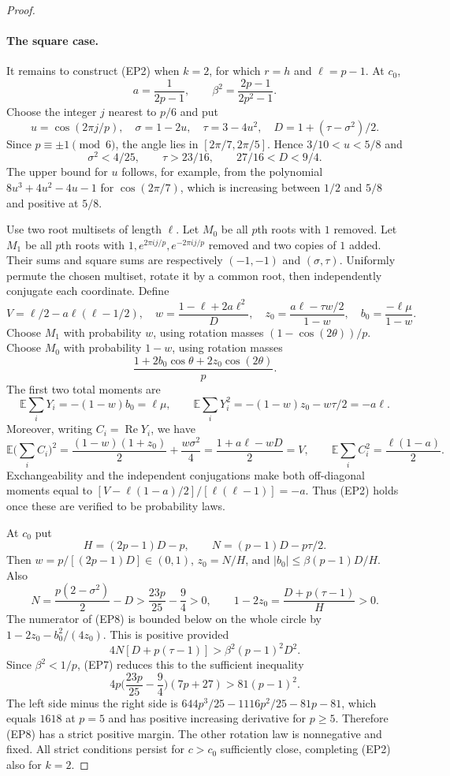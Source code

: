 \documentclass[11pt,a4paper]{article}
\theoremstyle{definition}\newtheorem{definition}[theorem]{Definition}
\theoremstyle{remark}\newtheorem{remark}[theorem]{Remark}
\begin{document}
\begin{proof}
\paragraph{The square case.}
It remains to construct (EP2) when $k=2$, for which $r=h$ and
$\ell=p-1$. At $c_0$,
\[
 a=\frac1{2p-1},\qquad \beta^2=\frac{2p-1}{2p^2-1}.
\]
Choose the integer $j$ nearest to $p/6$ and put
\[
 u=\cos(2\pi j/p),\quad \sigma=1-2u,\quad
 \tau=3-4u^2,\quad D=1+(\tau-\sigma^2)/2.
\]
Since $p\equiv\pm1\pmod6$, the angle lies in
$[2\pi/7,2\pi/5]$. Hence $3/10<u<5/8$ and
\[
 \sigma^2<4/25,\qquad \tau>23/16,\qquad 27/16<D<9/4.
\tag{EP7}
\]
The upper bound for $u$ follows, for example, from the polynomial
$8u^3+4u^2-4u-1$ for $\cos(2\pi/7)$, which is increasing
between $1/2$ and $5/8$ and positive at $5/8$.

Use two root multisets of length $\ell$. Let $M_0$ be all $p$th
roots with $1$ removed. Let $M_1$ be all $p$th roots with
$1,e^{2\pi i j/p},e^{-2\pi i j/p}$ removed and two copies of $1$
added. Their sums and square sums are respectively $(-1,-1)$ and
$(\sigma,\tau)$. Uniformly permute the chosen multiset, rotate it
by a common root, then independently conjugate each coordinate.
Define
\[
 V=\ell/2-a\ell(\ell-1/2),\quad
 w=\frac{1-\ell+2a\ell^2}{D},\quad
 z_0=\frac{a\ell-\tau w/2}{1-w},\quad
 b_0=\frac{-\ell\mu}{1-w}.
\]
Choose $M_1$ with probability $w$, using rotation masses
$(1-\cos(2\theta))/p$. Choose $M_0$ with probability $1-w$,
using rotation masses
\[
 \frac{1+2b_0\cos\theta+2z_0\cos(2\theta)}p.
\tag{EP8}
\]
The first two total moments are
\[
 \mathbb E\sum_iY_i=-(1-w)b_0=\ell\mu,\qquad
 \mathbb E\sum_iY_i^2=-(1-w)z_0-w\tau/2=-a\ell.
\]
Moreover, writing $C_i=\operatorname{Re}Y_i$, we have
\[
 \mathbb E\Big(\sum_i C_i\Big)^2
 =\frac{(1-w)(1+z_0)}2+\frac{w\sigma^2}{4}
 =\frac{1+a\ell-wD}{2}=V,
 \qquad \mathbb E\sum_i C_i^2=\frac{\ell(1-a)}2.
\]
Exchangeability and the independent conjugations make both
 off-diagonal moments equal to
$[V-\ell(1-a)/2]/[\ell(\ell-1)]=-a$. Thus (EP2) holds once
these are verified to be probability laws.

At $c_0$ put
\[
 H=(2p-1)D-p,\qquad N=(p-1)D-p\tau/2.
\]
Then $w=p/[(2p-1)D]\in(0,1)$, $z_0=N/H$, and
$|b_0|\le\beta(p-1)D/H$. Also
\[
 N=\frac{p(2-\sigma^2)}2-D>\frac{23p}{25}-\frac94>0,
 \qquad 1-2z_0=\frac{D+p(\tau-1)}H>0.
\]
The numerator of (EP8) is bounded below on the whole circle by
$1-2z_0-b_0^2/(4z_0)$. This is positive provided
\[
 4N[D+p(\tau-1)]>\beta^2(p-1)^2D^2.
\]
Since $\beta^2<1/p$, (EP7) reduces this to the sufficient inequality
\[
 4p\Big(\frac{23p}{25}-\frac94\Big)(7p+27)>81(p-1)^2.
\]
The left side minus the right side is
$644p^3/25-1116p^2/25-81p-81$, which equals $1618$ at $p=5$
and has positive increasing derivative for $p\ge5$. Therefore
(EP8) has a strict positive margin. The other rotation law is
nonnegative and fixed. All strict conditions persist for
$c>c_0$ sufficiently close, completing (EP2) also for $k=2$.


\end{proof}
\end{document}
